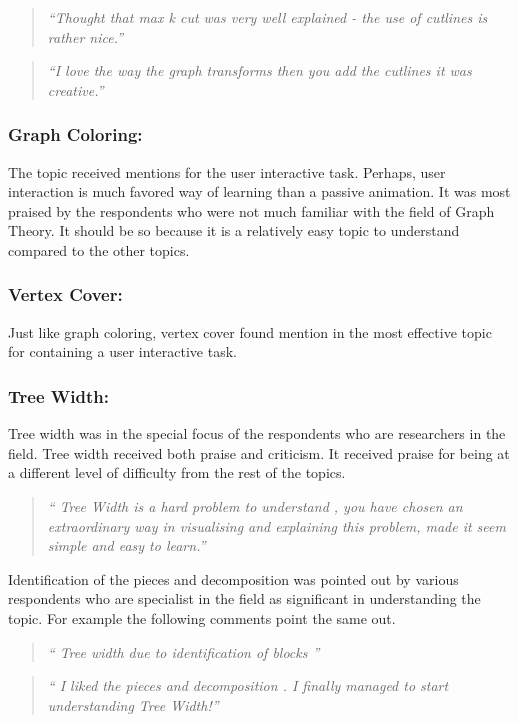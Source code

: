 \begin{quote}
\emph{``Thought that max k cut was very well explained - the use of cutlines is
rather nice.''}
\end{quote}

\begin{quote}
\emph{``I love the way the graph transforms then you add the cutlines it was
creative.''}
\end{quote}

\subsubsection{Graph Coloring:}
The topic received mentions for the user interactive task. Perhaps, user
interaction is much favored way of learning than a passive animation.
It was most praised by the respondents who were not much familiar with
the field of Graph Theory. It should be so because it is a relatively easy
topic to understand compared to the other topics.

\subsubsection{Vertex Cover:}
Just like graph coloring, vertex cover found mention in the most effective topic for 
containing a user interactive task.

\subsubsection{Tree Width:}
Tree width was in the special focus of the respondents who are researchers in
the field.  Tree width received both praise and criticism. It received praise
for being at a different level of difficulty from the rest of the topics.

\begin{quote}
\emph{``
Tree Width is a hard problem to understand , you
have chosen an extraordinary way in visualising and explaining this
problem, made it seem simple and easy to learn.''}
\end{quote}

Identification of the pieces and decomposition was pointed out by various
respondents who are specialist in the field as significant in understanding the
topic. For example the following comments point the same out.

\begin{quote}
\emph{``
Tree width due to identification of blocks
''}
\end{quote}
\begin{quote}
\emph{``
I liked the pieces and decomposition .
I finally managed to start understanding Tree Width!''}
\end{quote}

